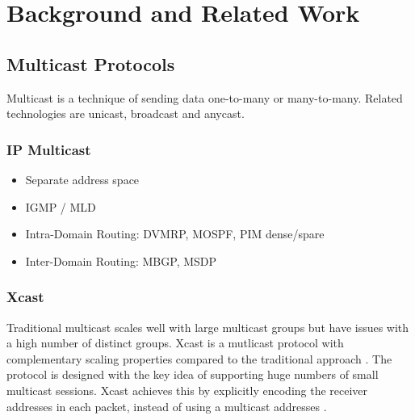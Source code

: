 \chapter{Background and Related Work} %
\label{chap:Background and Work}

\section{Multicast Protocols} %
\label{sec:Mutlicast Protocols}
Multicast is a technique of sending data one-to-many or many-to-many.
Related technologies are unicast, broadcast and anycast.

\subsection{IP Multicast} %
\label{sub:IP Multicast}
\begin{itemize}\itemsep0em
    \item Separate address space
    \item IGMP / MLD
    \item Intra-Domain Routing: DVMRP, MOSPF, PIM dense/spare
    \item Inter-Domain Routing: MBGP, MSDP
\end{itemize}



\subsection{Xcast}
\label{sub:Xcast}
Traditional multicast scales well with large multicast groups but have issues
with a high number of distinct groups.
Xcast is a mutlicast protocol with complementary scaling properties compared to
the traditional approach \cite{xcast_rfc}.
The protocol is designed with the key idea of supporting huge numbers of small
multicast sessions.
Xcast achieves this by explicitly encoding the receiver addresses in each
packet, instead of using a multicast addresses \cite{xcast_rfc}.

